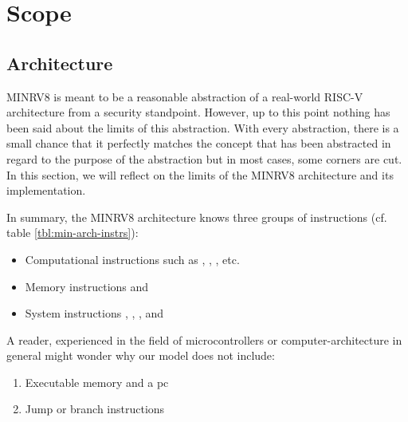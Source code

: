 \section{Scope}
\label{sec:scope}

\subsection{Architecture}
\label{sec:discuss-arch}

MINRV8 is meant to be a reasonable abstraction of a real-world RISC-V architecture from a security standpoint.
However, up to this point nothing has been said about the limits of this abstraction.
With every abstraction, there is a small chance that it perfectly matches the concept that has been abstracted in regard to the purpose of the abstraction but in most cases, some corners are cut.
In this section, we will reflect on the limits of the MINRV8 architecture and its implementation.

In summary, the MINRV8 architecture knows three groups of instructions (cf. table \ref{tbl:min-arch-instrs}):
\begin{itemize}
    \item Computational instructions such as , , , etc.
    \item Memory instructions  and 
    \item System instructions , , , and 
\end{itemize}

A reader, experienced in the field of microcontrollers or computer-architecture in general might wonder why our model does not include:
\begin{enumerate}
    \item Executable memory and a \gls{pc}
    \item Jump or branch instructions
\end{enumerate}

